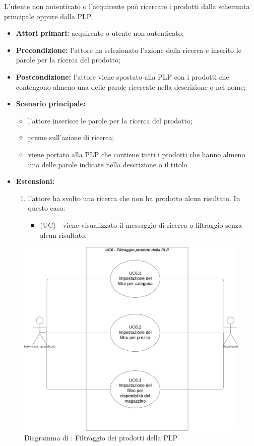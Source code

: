 L'utente non autenticato o l'acquirente può ricercare i prodotti dalla schermata principale oppure dalla PLP.
\begin{itemize}
    \item \textbf{Attori primari:} acquirente o utente non autenticato;
    \item \textbf{Precondizione:} l'attore ha selezionato l'azione della ricerca e inserito le parole per la ricerca del prodotto;
    \item \textbf{Postcondizione:} l'attore viene spostato alla PLP con i prodotti che contengono almeno una delle parole ricercate nella descrizione o nel nome;
    \item \textbf{Scenario principale:} 
    \begin{itemize}
        \item l'attore inserisce le parole per la ricerca del prodotto;
        \item preme sull'azione di ricerca;
        \item viene portato alla PLP che contiene tutti i prodotti che hanno almeno una delle parole indicate nella descrizione o il titolo
    \end{itemize}
    \item \textbf{Estensioni:}
    \begin{enumerate}
        \item l'attore ha svolto una ricerca che non ha prodotto alcun risultato. In questo caso:
        \begin{itemize}
            \item (UC) - viene visualizzato il messaggio di ricerca o filtraggio senza alcun risultato.
        \end{itemize}
    \end{enumerate}
\end{itemize}

\begin{figure}[H]
    \centering
    \includegraphics[scale=0.5]{Immagini/DiagrammiUC/UC6FiltraggioProdottiDellaPLP.png}
    \caption{Diagramma di \actualUC: Filtraggio dei prodotti della PLP} 
\end{figure}

